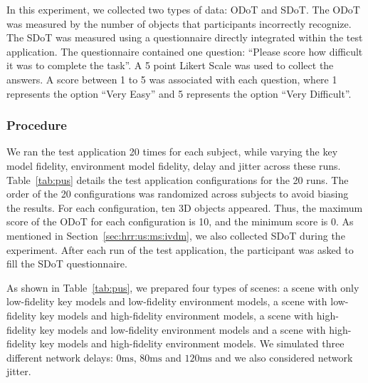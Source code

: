 In this experiment, we collected two types of data: ODoT and SDoT.
The ODoT was measured by the number of objects that participants incorrectly recognize.
The SDoT was measured using a questionnaire directly integrated within the test application. The questionnaire contained one question: ``Please score how difficult it was to complete the task''. A 5 point Likert Scale was used to collect the answers. A score between 1 to 5 was associated with each question, where 1 represents the option ``Very Easy'' and 5 represents the option ``Very Difficult''.

\subsubsection{Procedure}
\label{sec:hrr:us:ms:pro}

We ran the test application 20 times for each subject, while varying the key model fidelity, environment model fidelity, delay and jitter across these runs. Table~\ref{tab:pus} details the test application configurations for the 20 runs. The order of the 20 configurations was randomized across subjects to avoid biasing the results.
For each configuration, ten 3D objects appeared. Thus, the maximum score of the ODoT for each configuration is 10, and the minimum score is 0.
As mentioned in Section~\ref{sec:hrr:us:ms:ivdm}, we also collected SDoT during the experiment. After each run of the test application, the participant was asked to fill the SDoT questionnaire.

As shown in Table~\ref{tab:pus}, we prepared four types of scenes: a scene with only low-fidelity key models and low-fidelity environment models, a scene with low-fidelity key models and high-fidelity environment models, a scene with high-fidelity key models and low-fidelity environment models and a scene with high-fidelity key models and high-fidelity environment models. We simulated three different network delays: $0\mathrm{ms}$, $80\mathrm{ms}$ and $120\mathrm{ms}$ and we also considered network jitter.

